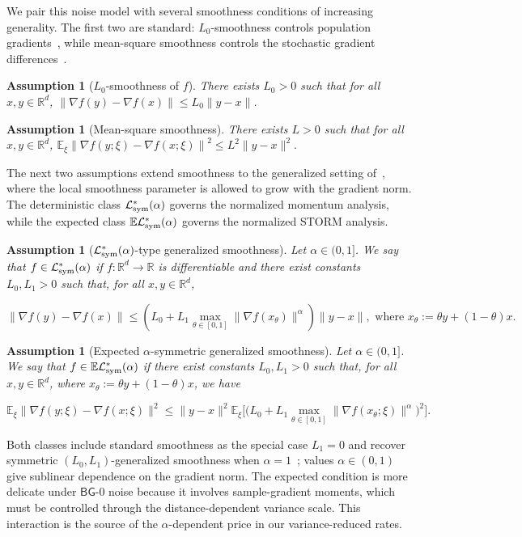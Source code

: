 \documentclass[letter,11pt]{article}
\newtheorem{assumption}[]{Assumption}
\newcommand{\E}{\mathbb{E}}
\newcommand{\R}{\mathbb{R}}
\newcommand{\Lcal}{\mathcal{L}}
\begin{document}
We pair this noise model with several smoothness conditions of increasing generality. The first two are standard: $L_0$-smoothness controls population gradients~\cite{ghadimi2013stochastic}, while mean-square smoothness controls the stochastic gradient differences~\cite{cutkosky2019momentum,li2021page}.
\begin{assumption}[$L_0$-smoothness of $f$]
\label{as:l0_smooth}
There exists $L_0>0$ such that for all $x,y\in\R^d$, $\|\nabla f(y)-\nabla f(x)\| \le L_0\|y-x\|$.
\end{assumption}
\begin{assumption}[Mean-square smoothness]
\label{as:mss}
There exists $L>0$ such that for all $x,y\in\R^d$, $\E_\xi \left\| \nabla f(y;\xi)-\nabla f(x;\xi) \right\|^2 \le L^2\|y-x\|^2.$
\end{assumption}
The next two assumptions extend smoothness to the generalized setting of~\citet{chen2023generalized}, where the local smoothness parameter is allowed to grow with the gradient norm. The deterministic class $\Lcal_{\rm sym}^*(\alpha)$ governs the normalized momentum analysis, while the expected class $\E\Lcal_{\rm sym}^*(\alpha)$ governs the normalized STORM analysis.
\begin{assumption}[$\Lcal_{\rm sym}^*(\alpha)$-type generalized smoothness]
\label{as:lsym_alpha}
Let $\alpha\in(0,1]$. We say that $f\in\Lcal_{\rm sym}^*(\alpha)$ if $f:\R^d\to\R$ is differentiable and there exist constants $L_0, L_1>0$ such that, for all $x,y\in\R^d$,

\[
\|\nabla f(y)-\nabla f(x)\| \le \left( L_0 + L_1 \max_{\theta\in[0,1]} \|\nabla f(x_\theta)\|^\alpha \right) \|y-x\|, \text{ where }  x_\theta:=\theta y+(1-\theta)x.
\]
\end{assumption}
\begin{assumption}[Expected $\alpha$-symmetric generalized smoothness]
\label{as:elsym_alpha}
Let $\alpha\in(0,1]$. We say that $f \in \E\Lcal_{\rm sym}^*(\alpha)$ if there exist constants $L_0, L_1>0$ such that, for all $x,y\in\R^d$, where $x_\theta:=\theta y+(1-\theta)x$, we have

\[
\E_\xi \big\| \nabla f(y;\xi)-\nabla f(x;\xi) \big\|^2 \le \|y-x\|^2 \E_\xi \big[ \big( L_0 + L_1 \max_{\theta\in[0,1]} \|\nabla f(x_\theta;\xi)\|^\alpha \big)^2 \big].
\]

\end{assumption}
Both classes include standard smoothness as the special case $L_1=0$ and recover symmetric $(L_0,L_1)$-generalized smoothness when $\alpha=1$~\cite{khirirat2026error}; values $\alpha\in(0,1)$ give sublinear dependence on the gradient norm. The expected condition is more delicate under $\mathsf{BG}$-0 noise because it involves sample-gradient moments, which must be controlled through the distance-dependent variance scale. This interaction is the source of the $\alpha$-dependent price in our variance-reduced rates.
\end{document}
